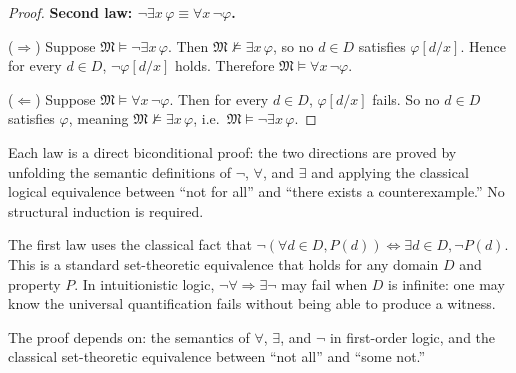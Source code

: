 \begin{proof}
\medskip
\noindent\textbf{Second law: $\neg\exists x\,\varphi \equiv \forall x\,\neg\varphi$.}

($\Rightarrow$) Suppose $\mathfrak{M} \models \neg\exists x\,\varphi$. Then
$\mathfrak{M} \not\models \exists x\,\varphi$, so no $d \in D$ satisfies
$\varphi[d/x]$. Hence for every $d \in D$, $\neg\varphi[d/x]$ holds.
Therefore $\mathfrak{M} \models \forall x\,\neg\varphi$.

($\Leftarrow$) Suppose $\mathfrak{M} \models \forall x\,\neg\varphi$. Then for
every $d \in D$, $\varphi[d/x]$ fails. So no $d \in D$ satisfies $\varphi$,
meaning $\mathfrak{M} \not\models \exists x\,\varphi$, i.e.\ $\mathfrak{M}
\models \neg\exists x\,\varphi$. \AsReq
\end{proof}

\begin{remark*}
Each law is a direct biconditional proof: the two directions are proved by
unfolding the semantic definitions of $\neg$, $\forall$, and $\exists$ and
applying the classical logical equivalence between ``not for all'' and ``there
exists a counterexample.'' No structural induction is required.
\end{remark*}

\begin{remark*}
The first law uses the classical fact that $\neg(\forall d \in D, P(d))
\Leftrightarrow \exists d \in D, \neg P(d)$. This is a standard set-theoretic
equivalence that holds for any domain $D$ and property $P$. In
intuitionistic logic, $\neg\forall \Rightarrow \exists\neg$ may fail when $D$
is infinite: one may know the universal quantification fails without being able
to produce a witness.
\end{remark*}

\begin{remark*}[Dependencies]
The proof depends on: the semantics of $\forall$, $\exists$, and $\neg$ in
first-order logic, and the classical set-theoretic equivalence between ``not
all'' and ``some not.''
\end{remark*}

